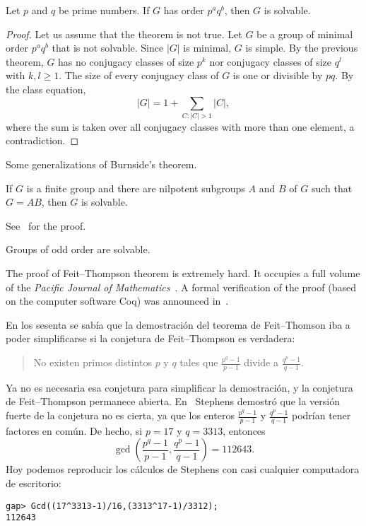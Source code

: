 \begin{theorem}[Burnside]
  Let $p$ and $q$ be prime numbers. If $G$ has order $p^aq^b$, then $G$ is solvable.
\end{theorem}

\begin{proof}
	Let us assume that the theorem is not true. Let $G$ be a group
	of minimal order $p^aq^b$
	that is not solvable. Since $|G|$ is minimal, $G$ is simple. By the previous theorem, 
	$G$ has no conjugacy classes of size $p^k$ nor 
	conjugacy classes of size $q^l$ with $k,l\geq1$. The size
	of every conjugacy class of $G$ is one or divisible by $pq$. 
	By the class
	equation, 
	\[
		|G|=1+\sum_{C:|C|>1}|C|,
	\]
	where the sum is taken over all conjugacy classes 
	with more than one element, a contradiction.
\end{proof}

Some generalizations of Burnside's theorem. 

\begin{theorem}
    If $G$ is a finite group and there are nilpotent subgroups 
    $A$ and $B$ of $G$ such that 
    $G=AB$, then $G$ is solvable.
\end{theorem}

See~\cite[Theorem 2.4.3]{MR1211633} for the proof.

\begin{theorem}
    Groups of odd order are solvable. 
\end{theorem}

The proof of Feit--Thompson theorem is extremely hard. 
It occupies a full volume of the 
\emph{Pacific Journal of Mathematics}~\cite{MR166261}. 
A formal verification of the proof 
(based on the computer software Coq) 
was announced in~\cite{MR3111271}.  

\medskip
{}
En los sesenta se sabía que la demostración del teorema de Feit--Thomson iba a poder simplificarse 
si la conjetura de Feit--Thompson es verdadera:

\begin{quote}
No existen primos distintos $p$ y $q$ tales que
$\frac {p^{q}-1}{p-1}$ divide a $\frac{q^{p} - 1}{q - 1}$. 
\end{quote}

Ya no es necesaria esa conjetura para simplificar la demostración, 
y la conjetura de Feit--Thompson permanece abierta. 
En~\cite{MR297686} 
Stephens demostró que la versión fuerte de la conjetura no es cierta, ya que 
los enteros $\frac {p^{q}-1}{p-1}$ y $\frac{q^{p} - 1}{q - 1}$ 
podrían tener factores en común. De hecho, si $p=17$ y $q=3313$, 
entonces 
\[
\gcd\left(\frac {p^{q}-1}{p-1},\frac{q^{p} - 1}{q - 1}\right)=112643.
\]
Hoy podemos reproducir los cálculos de 
Stephens con casi cualquier computadora de escritorio:
\begin{lstlisting}
gap> Gcd((17^3313-1)/16,(3313^17-1)/3312);
112643
\end{lstlisting}

